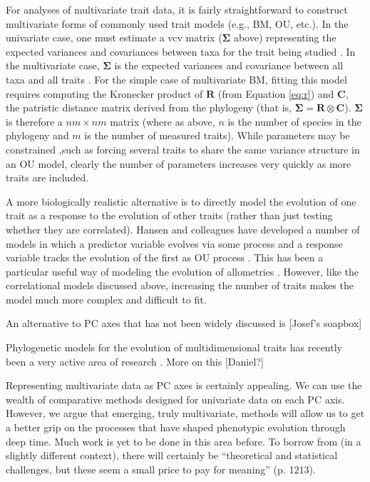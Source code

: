\documentclass[a4paper,12pt]{article}
\begin{document}
For analyses of multivariate trait data, it is fairly straightforward to construct multivariate forms of commonly used trait models (e.g., BM, OU, etc.). In the univariate case, one must estimate a vcv matrix ($\mathbf{\Sigma}$ above) representing the expected variances and covariances between taxa for the trait being studied \citep[see][for details]{Harmon2010, Omeara2012}. In the multivariate case, $\mathbf{\Sigma}$ is the expected variances and covariance between all taxa and all traits \citep{RevellHarmon, Hohenlohe2008, RevellCollar, ButlerKing2009, Motmot}. For the simple case of multivariate BM, fitting this model requires computing the Kronecker product of $\mathbf{R}$ (from Equation \ref{eq:r}) and $\mathbf{C}$, the patristic distance matrix derived from the phylogeny (that is, $\mathbf{\Sigma} = \mathbf{R} \otimes \mathbf{C}$). $\mathbf{\Sigma}$ is therefore a $nm \times nm$ matrix (where as above, $n$ is the number of species in the phylogeny and $m$ is the number of measured traits). While parameters may be constrained ,such as forcing several traits to share the same variance structure in an OU model, clearly the number of parameters increases very quickly as more traits are included.

A more biologically realistic alternative is to directly model the evolution of one trait as a response to the evolution of other traits (rather than just testing whether they are correlated). Hansen and colleagues have developed a number of models in which a predictor variable evolves via some process and a response variable tracks the evolution of the first as OU process \citep{Hansen2008, Labra2009, Bartozsek2012, Hansen2012SysBio}. This has been a particular useful way of modeling the evolution of allometries \citep{Hansen2012SysBio, Voje2013, Voje2014}. However, like the correlational models discussed above, increasing the number of traits makes the model much more complex and difficult to fit.

An alternative to PC axes that has not been widely discussed is [Josef's soapbox]

Phylogenetic models for the evolution of multidimensional traits has recently been a very active area of research \citep{Bookstein2012, Klingenberg2013, Monterio2013, Adams2013, Adams2014}. More on this [Daniel?]

Representing multivariate data as PC axes is certainly appealing. We can use the wealth of comparative methods designed for univariate data on each PC axis. However, we argue that emerging, truly multivariate, methods will allow us to get a better grip on the processes that have shaped phenotypic evolution through deep time. Much work is yet to be done in this area before. To borrow from \citet{HansenHoule2008} (in a slightly different context), there will certainly be ``theoretical and statistical challenges, but these seem a small price to pay for meaning'' (p. 1213).
\end{document}
